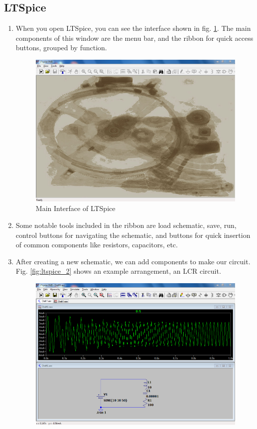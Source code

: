 \documentclass{article}
\begin{document}
\subsection{LTSpice}
\begin{enumerate}
	\item When you open LTSpice, you can see the interface shown in fig. \ref{fig:ltspice_main}. The main components of this window are the menu bar, and the ribbon for quick access buttons, grouped by function.
	\begin{figure}[h]
		\centering
		\includegraphics[width=0.7\linewidth]{Capture}
		\caption[Main Interface of LTSpice]{Main Interface of LTSpice}
		\label{fig:ltspice_main}
	\end{figure}
	\item Some notable tools included in the ribbon are load schematic, save, run, control buttons for navigating the schematic, and buttons for quick insertion of common components like resistors, capacitors, etc.
	\item After creating a new schematic, we can add components to make our circuit. Fig. \ref{fig:ltspice_2} shows an example arrangement, an LCR circuit.
	\begin{figure}[h]
		\centering
		\includegraphics[width=0.7\linewidth]{Capture2}

\end{figure}
\end{enumerate}
\end{document}
